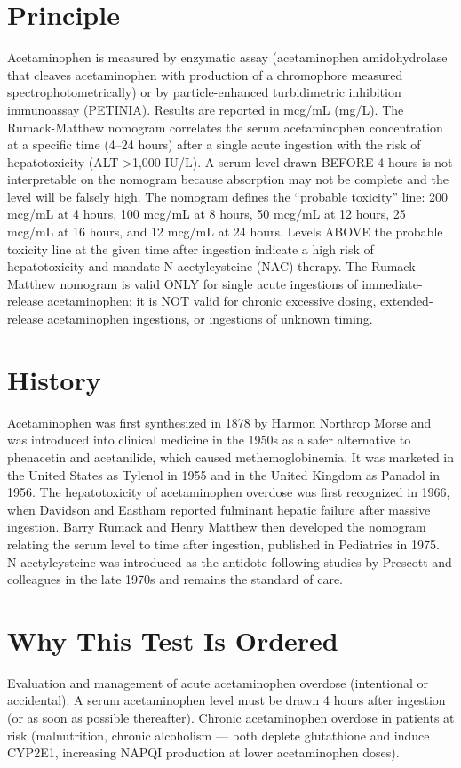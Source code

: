 \section*{Principle}
Acetaminophen is measured by enzymatic assay (acetaminophen amidohydrolase that cleaves acetaminophen with production of a chromophore measured spectrophotometrically) or by particle-enhanced turbidimetric inhibition immunoassay (PETINIA). Results are reported in mcg/mL (mg/L). The Rumack-Matthew nomogram correlates the serum acetaminophen concentration at a specific time (4--24 hours) after a single acute ingestion with the risk of hepatotoxicity (ALT >1,000 IU/L). A serum level drawn BEFORE 4 hours is not interpretable on the nomogram because absorption may not be complete and the level will be falsely high. The nomogram defines the ``probable toxicity'' line: 200 mcg/mL at 4 hours, 100 mcg/mL at 8 hours, 50 mcg/mL at 12 hours, 25 mcg/mL at 16 hours, and 12 mcg/mL at 24 hours. Levels ABOVE the probable toxicity line at the given time after ingestion indicate a high risk of hepatotoxicity and mandate N-acetylcysteine (NAC) therapy. The Rumack-Matthew nomogram is valid ONLY for single acute ingestions of immediate-release acetaminophen; it is NOT valid for chronic excessive dosing, extended-release acetaminophen ingestions, or ingestions of unknown timing.
\section*{History}
Acetaminophen was first synthesized in 1878 by Harmon Northrop Morse and was introduced into clinical medicine in the 1950s as a safer alternative to phenacetin and acetanilide, which caused methemoglobinemia. It was marketed in the United States as Tylenol in 1955 and in the United Kingdom as Panadol in 1956. The hepatotoxicity of acetaminophen overdose was first recognized in 1966, when Davidson and Eastham reported fulminant hepatic failure after massive ingestion. Barry Rumack and Henry Matthew then developed the nomogram relating the serum level to time after ingestion, published in Pediatrics in 1975. N-acetylcysteine was introduced as the antidote following studies by Prescott and colleagues in the late 1970s and remains the standard of care.
\section*{Why This Test Is Ordered}
Evaluation and management of acute acetaminophen overdose (intentional or accidental). A serum acetaminophen level must be drawn 4 hours after ingestion (or as soon as possible thereafter). Chronic acetaminophen overdose in patients at risk (malnutrition, chronic alcoholism --- both deplete glutathione and induce CYP2E1, increasing NAPQI production at lower acetaminophen doses).
